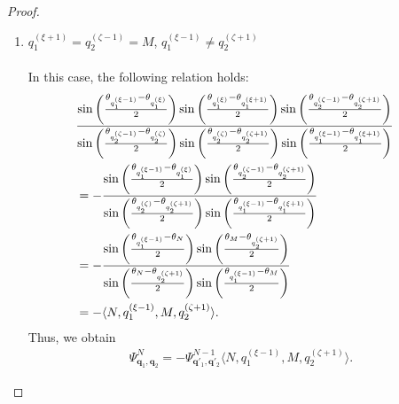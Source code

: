 \documentclass[10pt,a4paper]{amsart}
\begin{document}
\begin{proof}
\begin{enumerate}
\item[\textit{Case.5:}] ${q_1^{(\xi+1)}} = {q_2^{(\zeta-1)}} = M$, ${q_1^{(\xi-1)}} \ne {q_2^{(\zeta+1)}}$\\ \\
%
In this case, the following relation holds:
\begin{align}
    &\frac{\sin\left( \frac{\theta_{q_1^{(\xi-1)}} - \theta_{q_1^{(\xi)}}}{2} \right)\sin\left( \frac{\theta_{q_1^{(\xi)}} - \theta_{q_1^{(\xi+1)}}}{2} \right)\sin\left( \frac{\theta_{q_2^{(\zeta-1)}} - \theta_{q_2^{(\zeta+1)}}}{2} \right)}
   {\sin\left( \frac{\theta_{q_2^{(\zeta-1)}} - \theta_{q_2^{(\zeta)}}}{2} \right)\sin\left( \frac{\theta_{q_2^{(\zeta)}} - \theta_{q_2^{(\zeta+1)}}}{2} \right)\sin\left( \frac{\theta_{q_1^{(\xi-1)}} - \theta_{q_1^{(\xi+1)}}}{2} \right)}\cr
    &=-\frac{\sin\left( \frac{\theta_{q_1^{(\xi-1)}} - \theta_{q_1^{(\xi)}}}{2} \right)\sin\left( \frac{\theta_{q_2^{(\zeta-1)}} - \theta_{q_2^{(\zeta+1)}}}{2} \right)}
   {\sin\left( \frac{\theta_{q_2^{(\zeta)}} - \theta_{q_2^{(\zeta+1)}}}{2} \right)\sin\left( \frac{\theta_{q_1^{(\xi-1)}} - \theta_{q_1^{(\xi+1)}}}{2} \right)}\cr
    &=-\frac{\sin\left( \frac{\theta_{q_1^{(\xi-1)}} - \theta_{N}}{2} \right)\sin\left( \frac{\theta_{M} - \theta_{q_2^{(\zeta+1)}}}{2} \right)}
   {\sin\left( \frac{\theta_{N} - \theta_{q_2^{(\zeta+1)}}}{2} \right)\sin\left( \frac{\theta_{q_1^{(\xi-1)}} - \theta_{M}}{2} \right)}\cr
    &= -\langle N,q_1^{(\xi-1)},M, q_2^{(\zeta+1)}\rangle.
\end{align}
Thus, we obtain
\begin{align}
    \Psi^N_{\bm{q}_1, \bm{q}_2} = -\Psi^{N-1}_{\bm{q}'_1, \bm{q}'_2}\langle N,q_1^{(\xi-1)},M, q_2^{(\zeta+1)}\rangle.
\end{align}


\end{enumerate}
\end{proof}
\end{document}
